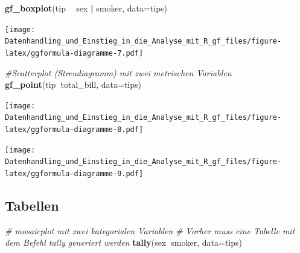\documentclass[10pt,ngerman,onside]{article}
\newenvironment{Shaded}{\begin{snugshade}}{\end{snugshade}}
\newcommand{\KeywordTok}[1]{\textcolor[rgb]{0.13,0.29,0.53}{\textbf{#1}}}
\newcommand{\DataTypeTok}[1]{\textcolor[rgb]{0.13,0.29,0.53}{#1}}
\newcommand{\StringTok}[1]{\textcolor[rgb]{0.31,0.60,0.02}{#1}}
\newcommand{\CommentTok}[1]{\textcolor[rgb]{0.56,0.35,0.01}{\textit{#1}}}
\newcommand{\OperatorTok}[1]{\textcolor[rgb]{0.81,0.36,0.00}{\textbf{#1}}}
\newcommand{\NormalTok}[1]{#1}
\begin{document}
\begin{Shaded}
\begin{Highlighting}[]
\KeywordTok{gf_boxplot}\NormalTok{(tip }\OperatorTok{~}\StringTok{ }\NormalTok{sex }\OperatorTok{|}\StringTok{ }\NormalTok{smoker, }\DataTypeTok{data=}\NormalTok{tips)}
\end{Highlighting}
\end{Shaded}

\texttt{[image: Datenhandling\_und\_Einstieg\_in\_die\_Analyse\_mit\_R\_gf\_files/figure-latex/ggformula-diagramme-7.pdf]}

\begin{Shaded}
\begin{Highlighting}[]
\CommentTok{#Scatterplot (Streudiagramm) mit zwei metrischen Variablen}
\KeywordTok{gf_point}\NormalTok{(tip}\OperatorTok{~}\NormalTok{total_bill, }\DataTypeTok{data=}\NormalTok{tips)}
\end{Highlighting}
\end{Shaded}

\texttt{[image: Datenhandling\_und\_Einstieg\_in\_die\_Analyse\_mit\_R\_gf\_files/figure-latex/ggformula-diagramme-8.pdf]}

\begin{Shaded}
\end{Shaded}

\texttt{[image: Datenhandling\_und\_Einstieg\_in\_die\_Analyse\_mit\_R\_gf\_files/figure-latex/ggformula-diagramme-9.pdf]}

\hypertarget{tabellen}{%
\subsection{Tabellen}\label{tabellen}}

\begin{Shaded}
\begin{Highlighting}[]
\CommentTok{# mosaicplot mit zwei kategorialen Variablen}
\CommentTok{# Vorher muss eine Tabelle mit dem Befehl tally generiert werden}
\KeywordTok{tally}\NormalTok{(sex}\OperatorTok{~}\NormalTok{smoker, }\DataTypeTok{data=}\NormalTok{tips)}
\end{Highlighting}
\end{Shaded}
\end{document}
